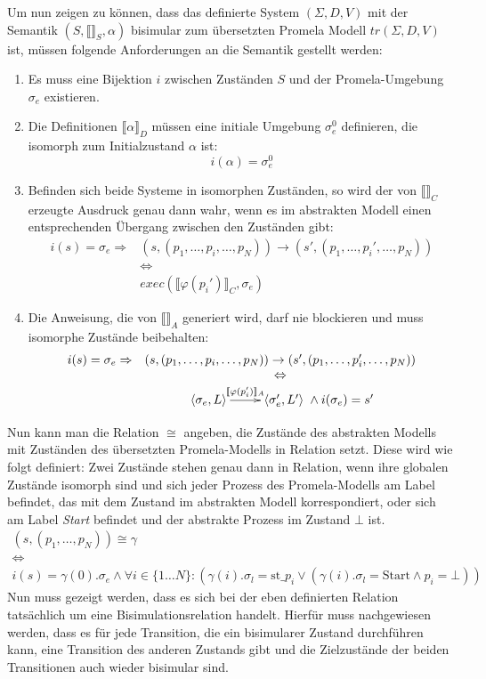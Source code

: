 Um nun zeigen zu können, dass das definierte System $(\Sigma,D,V)$ mit der Semantik $(S,\llbracket \rrbracket_S,\alpha)$ bisimular zum übersetzten Promela Modell $tr(\Sigma,D,V)$ ist, müssen folgende Anforderungen an die Semantik gestellt werden:
\begin{enumerate}
\item Es muss eine Bijektion $i$ zwischen Zuständen $S$ und der Promela-Umgebung $\sigma_e$ existieren.
\item Die Definitionen $\llbracket \alpha \rrbracket_D$ müssen eine initiale Umgebung $\sigma_e^0$ definieren, die isomorph zum Initialzustand $\alpha$ ist: 
  \[ i(\alpha) = \sigma_e^0 \]
\item Befinden sich beide Systeme in isomorphen Zuständen, so wird der von $\llbracket \rrbracket_C$ erzeugte Ausdruck genau dann wahr, wenn es im abstrakten Modell einen entsprechenden Übergang zwischen den Zuständen gibt:
  \[ \begin{array}{rc}
    i(s) = \sigma_e \Rightarrow &
    (s,(p_1,\dots,p_i,\dots,p_N))\rightarrow (s',(p_1,\dots,p_i',\dots,p_N)) \\
    & \Leftrightarrow\\
    & exec(\llbracket \varphi(p_i')\rrbracket_C,\sigma_e)
  \end{array} \]
\item Die Anweisung, die von $\llbracket \rrbracket_A$ generiert wird, darf nie blockieren und muss isomorphe Zustände beibehalten:
  \[ \begin{array}{rc}
    i(s) = \sigma_e \Rightarrow &
    (s,(p_1,\dots,p_i,\dots,p_N))\rightarrow (s',(p_1,\dots,p_i',\dots,p_N))\\
    & \Leftrightarrow\\
    & \xymatrix { \left<\sigma_e,L\right> \ar[r]^-{\llbracket \varphi(p_i')\rrbracket_A} & \left<\sigma_e',L'\right> } \land i(\sigma_e) = s'
  \end{array} \]
\end{enumerate}
Nun kann man die Relation $\cong$ angeben, die Zustände des abstrakten Modells mit Zuständen des übersetzten Promela-Modells in Relation setzt.
Diese wird wie folgt definiert:
Zwei Zustände stehen genau dann in Relation, wenn ihre globalen Zustände isomorph sind und sich jeder Prozess des Promela-Modells am Label befindet, das mit dem Zustand im abstrakten Modell korrespondiert, oder sich am Label \emph{Start} befindet und der abstrakte Prozess im Zustand $\bot$ ist.
\[
\begin{array}{c}
  (s,(p_1,\dots,p_N))\cong \gamma\\
  \Leftrightarrow\\
  i(s)=\gamma(0).\sigma_e \land \forall i\in\{1\dots N\}: (\gamma(i).\sigma_l = \textrm{st\_}p_i \lor (\gamma(i).\sigma_l = \textrm{Start}\land p_i=\bot))
\end{array}
\]
Nun muss gezeigt werden, dass es sich bei der eben definierten Relation tatsächlich um eine Bisimulationsrelation handelt.
Hierfür muss nachgewiesen werden, dass es für jede Transition, die ein bisimularer Zustand durchführen kann, eine Transition des anderen Zustands gibt und die Zielzustände der beiden Transitionen auch wieder bisimular sind.

